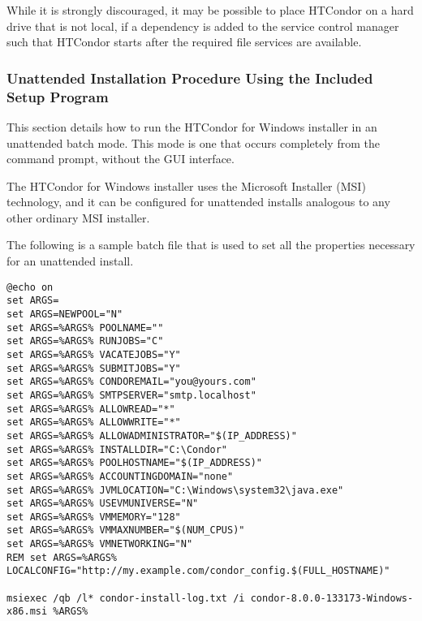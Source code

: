 \begin{description}
While it is strongly discouraged, 
it may be possible to place HTCondor on a hard drive that is not local,
if a dependency is added to the service control manager
such that HTCondor starts after the required file services
are available.


\end{description}


\subsubsection{\label{sec:nt-unattended-install-procedure}
Unattended Installation Procedure Using the Included Setup Program}

This section details how to run the HTCondor for Windows installer in an
unattended batch mode.
This mode is one that occurs completely from the command prompt,
without the GUI interface.

The HTCondor for Windows installer uses the Microsoft Installer (MSI)
technology, and it can be configured for unattended installs analogous
to any other ordinary MSI installer.

The following is a sample batch file that is used to set all the
properties necessary for an unattended install.

\begin{verbatim}
@echo on
set ARGS=
set ARGS=NEWPOOL="N"
set ARGS=%ARGS% POOLNAME=""
set ARGS=%ARGS% RUNJOBS="C"
set ARGS=%ARGS% VACATEJOBS="Y"
set ARGS=%ARGS% SUBMITJOBS="Y"
set ARGS=%ARGS% CONDOREMAIL="you@yours.com"
set ARGS=%ARGS% SMTPSERVER="smtp.localhost"
set ARGS=%ARGS% ALLOWREAD="*"
set ARGS=%ARGS% ALLOWWRITE="*"
set ARGS=%ARGS% ALLOWADMINISTRATOR="$(IP_ADDRESS)"
set ARGS=%ARGS% INSTALLDIR="C:\Condor"
set ARGS=%ARGS% POOLHOSTNAME="$(IP_ADDRESS)"
set ARGS=%ARGS% ACCOUNTINGDOMAIN="none"
set ARGS=%ARGS% JVMLOCATION="C:\Windows\system32\java.exe"
set ARGS=%ARGS% USEVMUNIVERSE="N"
set ARGS=%ARGS% VMMEMORY="128"
set ARGS=%ARGS% VMMAXNUMBER="$(NUM_CPUS)"
set ARGS=%ARGS% VMNETWORKING="N"
REM set ARGS=%ARGS% LOCALCONFIG="http://my.example.com/condor_config.$(FULL_HOSTNAME)"
 
msiexec /qb /l* condor-install-log.txt /i condor-8.0.0-133173-Windows-x86.msi %ARGS%
\end{verbatim}

